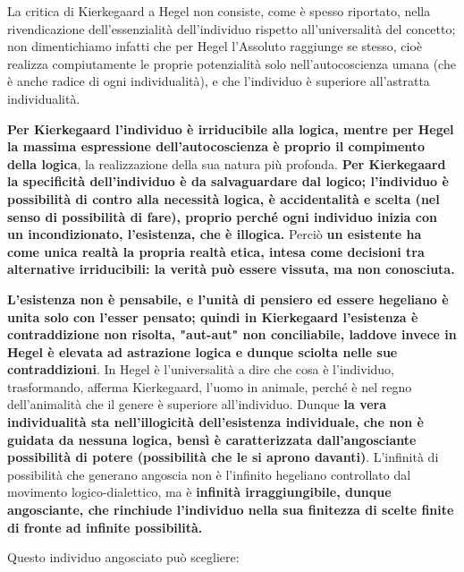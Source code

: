 La critica di Kierkegaard a Hegel non consiste, come è spesso riportato, nella rivendicazione dell'essenzialità dell'individuo rispetto all'universalità del concetto; non dimentichiamo infatti che per Hegel l'Assoluto raggiunge se stesso, cioè realizza compiutamente le proprie potenzialità solo nell'autocoscienza umana (che è anche radice di ogni individualità), e che l'individuo è superiore all'astratta individualità.

 \textbf{Per Kierkegaard l'individuo è irriducibile alla logica, mentre per Hegel la massima espressione dell'autocoscienza è proprio il compimento della logica}, la realizzazione della sua natura più profonda. \textbf{Per Kierkegaard la specificità dell'individuo è da salvaguardare dal logico; l'individuo è possibilità di contro alla necessità logica, è accidentalità e scelta (nel senso di possibilità di fare), proprio perché ogni individuo inizia con un incondizionato, l'esistenza, che è illogica.} Perciò \textbf{un esistente ha come unica realtà la propria realtà etica, intesa come decisioni tra alternative irriducibili: la verità può essere vissuta, ma non conosciuta.} 
 
 \textbf{L'esistenza non è pensabile, e l'unità di pensiero ed essere hegeliano è unita solo con l'esser pensato; quindi in Kierkegaard l'esistenza è contraddizione non risolta, "aut-aut" non conciliabile, laddove invece in Hegel è elevata ad astrazione logica e dunque sciolta nelle sue contraddizioni}. In Hegel è l'universalità  a dire che cosa è l'individuo, trasformando, afferma Kierkegaard, l'uomo in animale, perché è nel regno dell'animalità che il genere è superiore all'individuo. Dunque \textbf{la vera individualità sta nell'illogicità dell'esistenza individuale, che non è guidata da nessuna logica, bensì è caratterizzata dall'angosciante possibilità di potere (possibilità che le si aprono davanti)}. L'infinità di possibilità che generano angoscia non è l'infinito hegeliano controllato dal movimento logico-dialettico, ma è \textbf{infinità irraggiungibile, dunque angosciante, che rinchiude l'individuo nella sua finitezza di scelte finite di fronte ad infinite possibilità.}
 
 Questo individuo angosciato può scegliere:
 
